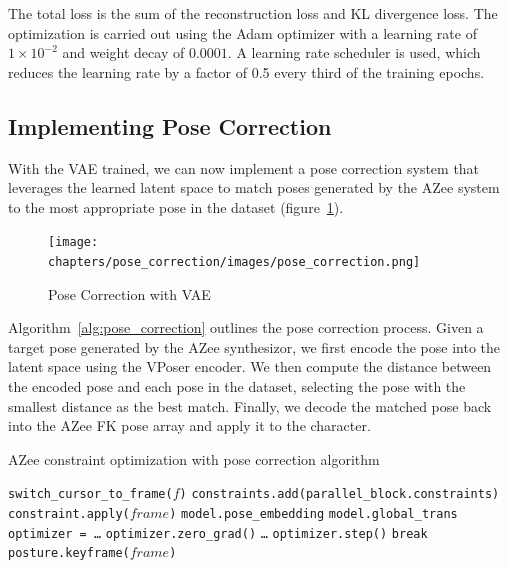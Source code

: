 \documentclass[../../main.tex]{subfiles}
\begin{document}
The total loss is the sum of the reconstruction loss and KL divergence loss. The optimization is carried out using the Adam optimizer with a learning rate of $1 \times 10^{-2}$ and weight decay of $0.0001$. A learning rate scheduler is used, which reduces the learning rate by a factor of 0.5 every third of the training epochs. 

\subsection{Implementing Pose Correction}
\label{ch:pose_correction:pose_correction_with_azee:implementation}

With the VAE trained, we can now implement a pose correction system that leverages the learned latent space to match poses generated by the AZee system to the most appropriate pose in the dataset (figure~\ref{fig:pose_correction}).

\begin{figure}
  \centering \texttt{[image: chapters/pose\_correction/images/pose\_correction.png]}
  \caption{Pose Correction with VAE}
  \label{fig:pose_correction}
\end{figure}

Algorithm~\ref{alg:pose_correction} outlines the pose correction process. Given a target pose generated by the AZee synthesizor, we first encode the pose into the latent space using the VPoser encoder. We then compute the distance between the encoded pose and each pose in the dataset, selecting the pose with the smallest distance as the best match. Finally, we decode the matched pose back into the AZee FK pose array and apply it to the character.

\begin{algorithm}
  \caption{AZee constraint optimization with pose correction algorithm}
  \label{alg:pose_correction}
  \begin{algorithmic}[1]
      \State \texttt{switch\_cursor\_to\_frame($f$)}
          \State \texttt{constraints.add(parallel\_block.constraints)}
      \EndFor
          \State \texttt{constraint.apply($frame$)}
      \EndFor
      \State \texttt{model.pose\_embedding}
      \State \texttt{model.global\_trans}
      \State \texttt{optimizer = \dots}
          \State \texttt{optimizer.zero\_grad()}
          \State \texttt{\dots}
          \State \texttt{optimizer.step()}
           \State \texttt{break} \EndIf
      \EndFor
      \State \texttt{posture.keyframe($frame$)}
  \EndFor
  \end{algorithmic}
  \end{algorithm}
\end{document}

